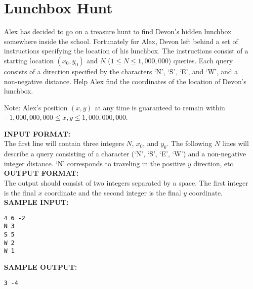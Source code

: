 \documentclass{article}
\begin{document}
\newcommand{\blank}{\vskip 3mm}
\setlength\parindent{0pt}
\renewcommand\thesection{\Alph{section}}

\setcounter{section}{1}
\section{Lunchbox Hunt}

Alex has decided to go on a treasure hunt to find Devon’s hidden lunchbox somewhere inside the school. Fortunately for Alex, Devon left behind a set of instructions specifying the location of his lunchbox. The instructions consist of a starting location $ (x_0, y_0) $ and $ N $ ($ 1 \leq N \leq 1,000,000 $) queries. Each query consists of a direction specified by the characters ‘N’, ‘S’, ‘E’, and ‘W’, and a non-negative distance. Help Alex find the coordinates of the location of Devon’s lunchbox.

Note: Alex's position $ (x, y) $ at any time is guaranteed to remain within $ -1,000,000,000 \leq x, y \leq 1,000,000,000 $.

\blank
\textbf{INPUT FORMAT:}\\
The first line will contain three integers $ N $, $ x_0 $, and $ y_0 $. The following $ N $ lines will describe a query consisting of a character (‘N’, ‘S’, ‘E’, ‘W’) and a non-negative integer distance. ‘N’ corresponds to traveling in the positive $ y $ direction, etc. 
\blank
\textbf{OUTPUT FORMAT:}\\
The output should consist of two integers separated by a space. The first integer is the final $ x $ coordinate and the second integer is the final $ y $ coordinate. 
\blank
\textbf{SAMPLE INPUT:}
\begin{verbatim}
4 6 -2
N 3
S 5
W 2
W 1
\end{verbatim}
\textbf{SAMPLE OUTPUT:}
\begin{verbatim}
3 -4
\end{verbatim}
\end{document}
